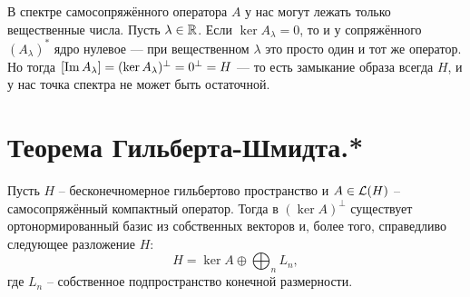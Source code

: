 \begin{notet}
    В спектре самосопряжённого оператора $A$ у нас могут лежать только вещественные числа.
    Пусть $\lambda \in \mathbb{R}$.
    Если $\ker A_\lambda = 0$, то и у сопряжённого $(A_\lambda)^*$ ядро нулевое — при вещественном $\lambda$ это просто один и тот же оператор.
    Но тогда $[\operatorname{Im} A_\lambda] = (\ker A_\lambda)^\perp = 0^\perp = H$ — то есть замыкание образа всегда $H$, и у нас точка спектра не может быть остаточной.
\end{notet}

\section{Теорема Гильберта-Шмидта.*}\label{seq:gilbert-shmidt}
\begin{theorem}
    Пусть $H$ -- бесконечномерное гильбертово пространство и $A \in \mathcal{L}(H)$ -- самосопряжённый компактный оператор.
    Тогда в $(\ker A)^\perp$ существует ортонормированный базис из собственных векторов и, более того, справедливо следующее разложение $H$:
    \[
        H = \ker A \oplus \bigoplus_{n} L_n,
    \]
    где $L_n$ -- собственное подпространство конечной размерности.
\end{theorem}
